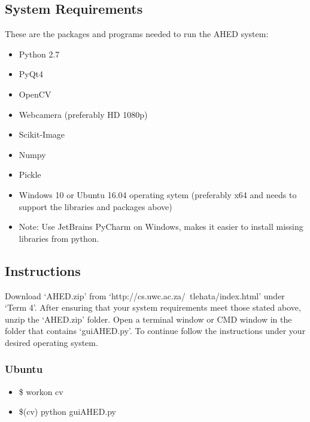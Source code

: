 \subsection{System Requirements}
These are the packages and programs needed to run the AHED system:
\begin{itemize}
\item Python 2.7
\item PyQt4
\item OpenCV
\item Webcamera (preferably HD 1080p)
\item Scikit-Image
\item Numpy
\item Pickle
\item Windows 10 or Ubuntu 16.04 operating sytem (preferably x64 and needs to support the libraries and packages above)
\item Note: Use JetBrains PyCharm on Windows, makes it easier to install missing libraries from python.
\end{itemize}

\subsection{Instructions}
Download `AHED.zip' from `http://cs.uwc.ac.za/~tlehata/index.html' under `Term 4'. After ensuring that your system requirements meet those stated above, unzip the `AHED.zip' folder. Open a terminal window or CMD window in the folder that contains `guiAHED.py'. To continue follow the instructions under your desired operating system.
\subsubsection{Ubuntu}
\begin{itemize} 
\item \$ workon cv
\item \$(cv) python guiAHED.py 
\end{itemize}
